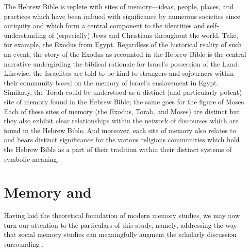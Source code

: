 The Hebrew Bible is replete with sites of memory---ideas, people, places, and practices which have been imbued with significance by numerous societies since antiquity and which form a central component to the identities and self-understanding of (especially) Jews and Christians throughout the world. Take, for example, the Exodus from Egypt. Regardless of the historical reality of such an event, the story of the Exodus as recounted in the Hebrew Bible is the central narrative undergirding the biblical rationale for Israel's possession of the Land. Likewise, the Israelites are told to be kind to strangers and sojourners within their community based on the memory of Israel's enslavement in Egypt. Similarly, the Torah could be understood as a distinct (and particularly potent) site of memory found in the Hebrew Bible; the same goes for the figure of Moses. Each of these sites of memory (the Exodus, Torah, and Moses) are distinct but they also exhibit clear relationships within the network of discourses which are found in the Hebrew Bible. And moreover, each site of memory also relates to and bears distinct significance for the various religious communities which hold the Hebrew Bible as a part of their tradition within their distinct systems of symbolic meaning. 

\section{Memory and \rwb}

Having laid the theoretical foundation of modern memory studies, we may now turn our attention to the particulars of this study, namely, addressing the way that social memory studies can meaningfully augment the scholarly discussion surrounding \rwb.%
    \autocite[See also][]{brooke_zsengeller2014}  

